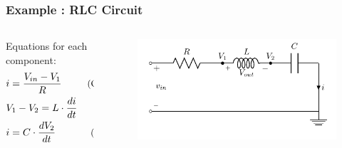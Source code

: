\begin{frame}
	
	\frametitle{Example : RLC Circuit}
	
	\begin{columns}
		\begin{column}{0.4\linewidth}
			Equations for each component:
			\begin{align*}
				&i = \frac{V_{in} - V_{1}}{R} 		&\text{\small(Ohm's law)}\\
				&V_1 - V_2 = L \cdot \frac{di}{dt} 	&\text{\small(Coil)}\\
				&i = C \cdot \frac{dV_2}{dt} 	 	&\text{\small(Capacitor)}
			\end{align*}
		\end{column}
		\begin{column}{0.6\linewidth}
			\begin{figure}
				\centering
				\includegraphics[width=1\linewidth]{img/circuit-RLC}
				\label{fig:circuit-RLC-small}
			\end{figure}
		\end{column}
		
	\end{columns}
	
\end{frame}

